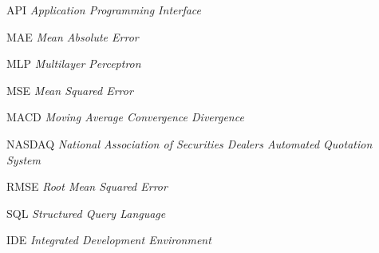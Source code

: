 \begin{siglas}
	\item[API] \textit{Application Programming Interface}
	\item[MAE] \textit{Mean Absolute Error}
	\item[MLP] \textit{Multilayer Perceptron}
	\item[MSE] \textit{Mean Squared Error}
	\item[MACD] \textit{Moving Average Convergence Divergence}
	\item[NASDAQ] \textit{National Association of Securities Dealers Automated Quotation System}
	\item[RMSE] \textit{Root Mean Squared Error}
	\item[SQL] \textit{Structured Query Language}
	\item[IDE] \textit{Integrated Development Environment}
\end{siglas}

